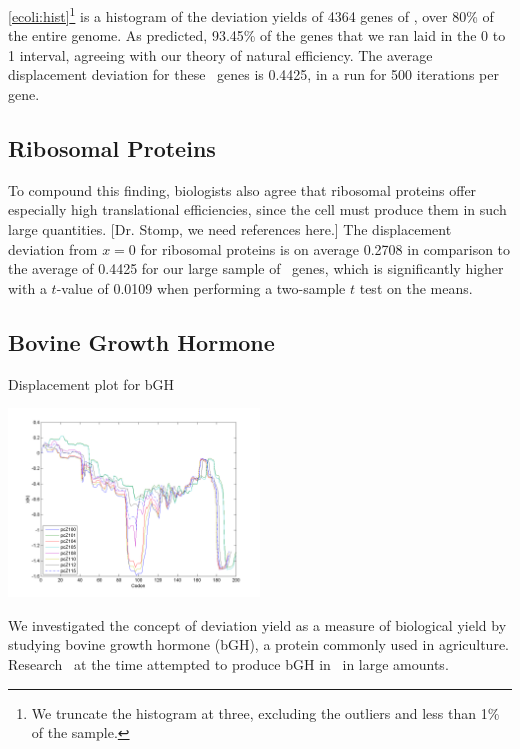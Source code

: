 \documentclass[12pt, draft]{article}
\numberwithin{equation}{section}
\begin{document}
\autoref{ecoli:hist}\footnote{We truncate the histogram at three, excluding
  the outliers and less than 1\% of the sample.} is a histogram of the
deviation yields of 4364 genes of \ecoli, over 80\% of the entire
genome.  As predicted, 93.45\% of the genes that we ran laid in the 0
to 1 interval, agreeing with our theory of natural efficiency.  The
average displacement deviation for these \ecoli\ genes is 0.4425, in a
run for 500 iterations per gene.

\subsection{Ribosomal Proteins}
\label{section:riboproteins}
To compound this finding, biologists also agree that ribosomal
proteins offer especially high translational efficiencies, since the
cell must produce them in such large quantities. [Dr. Stomp, we need
  references here.] The displacement deviation from $x=0$ for ribosomal proteins
is on average 0.2708 in comparison to the average of 0.4425 for our
large sample of \ecoli\ genes, which is significantly higher with a $t$-value of
0.0109 when performing a two-sample $t$ test on the means.

\subsection{Bovine Growth Hormone}
\label{section:bgh}

\begin{cfigure}
  \caption{Displacement plot for bGH}
  \label{bgh:disp}
  \includegraphics[width=0.5\textwidth]{bgh/all}
\end{cfigure}

We investigated the concept of deviation yield as a measure of biological
yield by studying bovine growth hormone (bGH), a protein commonly used
in agriculture.
Research~\cite{schoner:bgh} at the time attempted to produce bGH
in \ecoli\ in large amounts.


\end{document}
